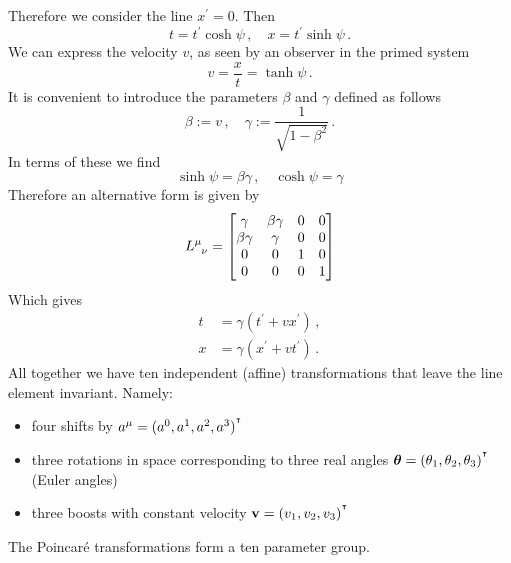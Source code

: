 Therefore we consider the line $x^\prime= 0$.
Then
\begin{equation}
    t=t^\prime\cosh\psi\, ,\quad
    x=t^\prime\sinh\psi\, .
\end{equation}
We can express the velocity $v$, as seen by an observer in the primed system
\begin{equation}
    v=\frac{x}{t}=\tanh\psi\,.
\end{equation}
It is convenient to introduce the parameters $\beta$ and $\gamma$ defined as
follows
\begin{equation}
    \beta:=v\, ,\quad\gamma:=\frac{1}{\sqrt{1-\beta^2}}\, .
\end{equation}
In terms of these we find
\begin{equation}
    \sinh\psi = \beta\gamma\, , \quad \cosh\psi=\gamma
\end{equation}
Therefore an alternative form is given by
\begin{equation}
    \tensor{L}{^\mu_\nu}=\begin{bmatrix}
\gamma&\beta\gamma & 0&0\\
\beta\gamma&\gamma &0&0\\
0&0&1 &0\\
0&0 &0 &1
\end{bmatrix}
\end{equation}
Which gives
\begin{align}
    t&=\gamma\left(t^\prime+vx^\prime\right)\, ,\\
    x&=\gamma\left(x^\prime+vt^\prime\right)\, .
\end{align}
All together we have ten independent (affine) transformations that leave the
line element invariant. Namely:
\begin{itemize}
    \item four shifts by $a^\mu=(a^0,a^1,a^2,a^3)^{^\intercal}$
    \item three rotations in space corresponding to three real angles
    $\boldsymbol{\theta}=(\theta_1,\theta_2,\theta_3)^{^\intercal}$ (Euler angles)
    \item three boosts with constant velocity $\mathbf{v}=(v_1,v_2,v_3)^{^\intercal}$
\end{itemize}
The Poincaré transformations form a ten parameter group.
